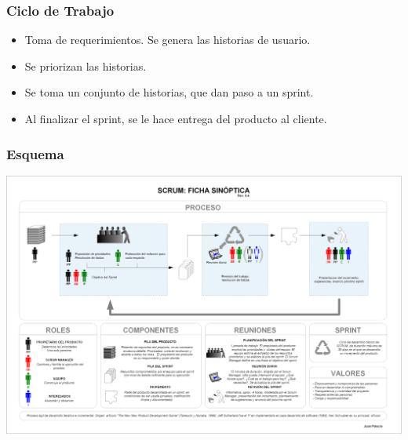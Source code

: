 \documentclass[12pt]{beamer}
\begin{document}
\begin{frame}
 \frametitle{Ciclo de Trabajo}
 \begin{itemize}
  \item<2-> Toma de requerimientos. Se genera las historias de usuario.
  \item<3-> Se priorizan las historias.
  \item<4-> Se toma un conjunto de historias, que dan paso a un sprint.
  \item<5-> Al finalizar el sprint, se le hace entrega del producto al cliente.
 \end{itemize}

\end{frame}


\begin{frame}
\frametitle{Esquema}
  \includegraphics[scale=0.38]{img/Ficha_scrum.png}
\end{frame}



\end{document}
